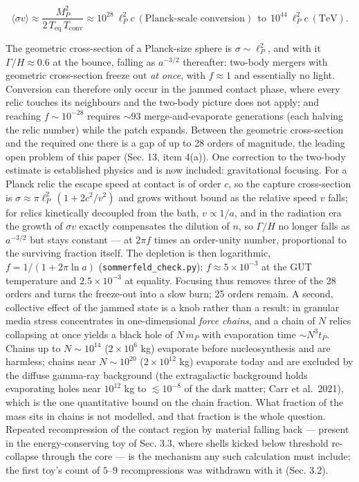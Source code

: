 \documentclass[
  11pt,
]{article}
\begin{document}
\[\langle\sigma v\rangle \approx \frac{M_P^2}{2\,T_{\text{eq}}\,T_{\text{conv}}} \approx 10^{28}\ \ell_P^2 c\ (\text{Planck-scale conversion})\ \ \text{to}\ \ 10^{44}\ \ell_P^2 c\ (\text{TeV}).\]

The geometric cross-section of a Planck-size sphere is
\(\sigma \sim \ell_P^2\), and with it \(\Gamma/H \approx 0.6\) at the
bounce, falling as \(a^{-3/2}\) thereafter: two-body mergers with
geometric cross-section freeze out \emph{at once}, with \(f \approx 1\)
and essentially no light. Conversion can therefore only occur in the
jammed contact phase, where every relic touches its neighbours and the
two-body picture does not apply; and reaching \(f \sim 10^{-28}\)
requires \(\sim\!93\) merge-and-evaporate generations (each halving the
relic number) while the patch expands. Between the geometric
cross-section and the required one there is a gap of up to 28 orders of
magnitude, the leading open problem of this paper (Sec. 13, item 4(a)).
One correction to the two-body estimate is established physics and is
now included: gravitational focusing. For a Planck relic the escape
speed at contact is of order \(c\), so the capture cross-section is
\(\sigma \approx \pi\ell_P^2\,(1 + 2c^2/v^2)\) and grows without bound
as the relative speed \(v\) falls; for relics kinetically decoupled from
the bath, \(v \propto 1/a\), and in the radiation era the growth of
\(\sigma v\) exactly compensates the dilution of \(n\), so \(\Gamma/H\)
no longer falls as \(a^{-3/2}\) but stays constant --- at \(2\pi f\)
times an order-unity number, proportional to the surviving fraction
itself. The depletion is then logarithmic, \(f = 1/(1 + 2\pi\ln a)\)
(\texttt{sommerfeld\_check.py}): \(f \approx 5\times10^{-3}\) at the GUT
temperature and \(2.5\times10^{-3}\) at equality. Focusing thus removes
three of the 28 orders and turns the freeze-out into a slow burn; 25
orders remain. A second, collective effect of the jammed state is a knob
rather than a result: in granular media stress concentrates in
one-dimensional \emph{force chains}, and a chain of \(N\) relics
collapsing at once yields a black hole of \(N\,m_P\) with evaporation
time \(\sim N^3 t_P\). Chains up to \(N \sim 10^{14}\)
(\(2\times10^{6}\) kg) evaporate before nucleosynthesis and are
harmless; chains near \(N \sim 10^{20}\) (\(2\times10^{12}\) kg)
evaporate today and are excluded by the diffuse gamma-ray background
(the extragalactic background holds evaporating holes near \(10^{12}\)
kg to \(\lesssim 10^{-8}\) of the dark matter; Carr et al.~2021), which
is the one quantitative bound on the chain fraction. What fraction of
the mass sits in chains is not modelled, and that fraction is the whole
question. Repeated recompression of the contact region by material
falling back --- present in the energy-conserving toy of Sec. 3.3, where
shells kicked below threshold re-collapse through the core --- is the
mechanism any such calculation must include; the first toy's count of
\(5\)--\(9\) recompressions was withdrawn with it (Sec. 3.2).
\end{document}
